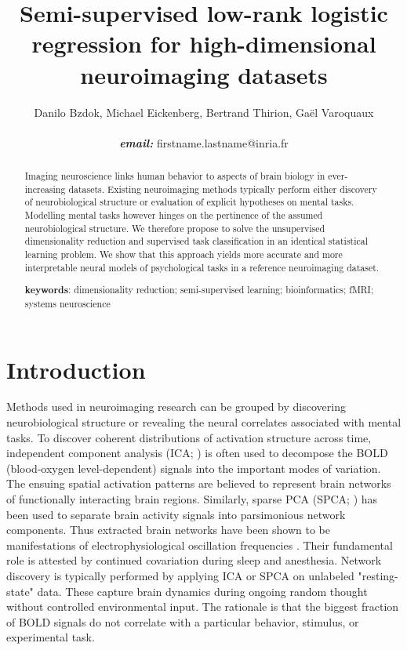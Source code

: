 \documentclass{article} %
\title{Semi-supervised low-rank logistic regression for
high-dimensional neuroimaging datasets}
\begin{document}
\maketitle

\author{Danilo Bzdok, Michael Eickenberg, Bertrand Thirion, Ga\"el
  Varoquaux \\\\\textbf{\textit{email:} }firstname.lastname@inria.fr}

\begin{abstract}
Imaging neuroscience links human behavior to aspects of brain
biology in ever-increasing datasets.
%
Existing neuroimaging methods typically perform either discovery of
neurobiological structure or evaluation of explicit hypotheses on mental tasks.
%
Modelling mental tasks however hinges
on the pertinence of the assumed neurobiological structure.
%
We therefore propose to solve the unsupervised dimensionality reduction
and supervised task classification in
an identical statistical learning problem.
%
We show that this approach yields more accurate and more interpretable
neural models of psychological tasks in a reference neuroimaging dataset.
%

\textbf{keywords}: dimensionality reduction; semi-supervised learning;
bioinformatics; fMRI; systems neuroscience

\end{abstract}


\section{Introduction}
%
Methods used in neuroimaging research can be grouped by discovering
neurobiological structure or revealing the neural correlates associated
with mental tasks.
To discover coherent distributions of activation structure across time,
independent component analysis (ICA; \cite{beckmann2005}) is often used
to decompose the BOLD (blood-oxygen level-dependent) signals into the
important modes of variation.
The ensuing spatial activation patterns are believed to represent
brain networks of
functionally interacting brain regions.
Similarly, sparse PCA (SPCA; \cite{varoqu2011}) has been used to
separate brain activity signals into parsimonious network components.
Thus extracted brain networks have been shown to be
manifestations of electrophysiological oscillation frequencies \cite{hipp15}.
Their fundamental role is
attested by continued covariation during sleep and anesthesia.
%
Network discovery is typically performed by applying ICA or SPCA on
unlabeled "resting-state" data. These capture brain dynamics
during ongoing random thought without controlled environmental input.
The rationale is that the biggest fraction of BOLD signals do
not correlate with a particular behavior, stimulus, or experimental task. 
\end{document}
